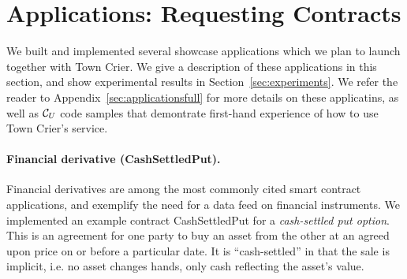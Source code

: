 \section{Applications: Requesting Contracts}
\label{sec:applications}

We built and implemented several showcase applications which we plan
to launch together with Town Crier.
We give a description of these applications in this section,
and show experimental results in Section~\ref{sec:experiments}.
We refer the reader to Appendix~\ref{sec:applicationsfull}
for more details on these applicatins,
as well as ${\cal C}_U$ code samples that demontrate
first-hand experience of how to use Town Crier's service.


\paragraph{Financial derivative ({\sf CashSettledPut}).}
Financial derivatives are among the most commonly cited smart contract
applications,
and exemplify the need for a data feed on financial instruments.
We implemented an example contract {\sf CashSettledPut} for a {\em cash-settled put option}.
This is an agreement for one party to buy an asset from the other at an agreed upon price on or before a particular date.
It is ``cash-settled'' in that the sale is implicit, i.e. no asset changes hands, only cash reflecting the asset's value.
%
\iffalse
